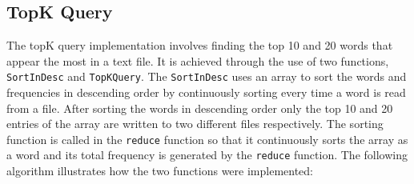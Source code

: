 \documentclass[conference]{IEEEtran}
\begin{document}
\subsection{TopK Query}
The topK query implementation involves finding the top 10 and 20 words that appear the most in a text file. It is achieved through the use of two functions, \texttt{SortInDesc} and \texttt{TopKQuery}. The \texttt{SortInDesc} uses an array to sort the words and frequencies in descending order by continuously sorting every time a word is read from a file. After sorting the words in descending order only the top 10 and 20 entries of the array are written to two different files respectively. The sorting function is called in the \texttt{reduce} function so that it continuously sorts the array as a word and its total frequency is generated by the \texttt{reduce} function. The following algorithm illustrates how the two functions were implemented:
\linesnumbered
\end{document}
